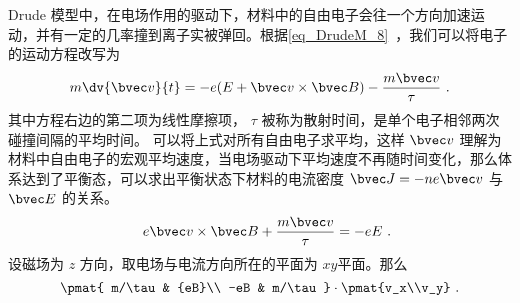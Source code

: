 Drude 模型中，在电场作用的驱动下，材料中的自由电子会往一个方向加速运动，并有一定的几率撞到离子实被弹回。根据\autoref{eq_DrudeM_8}~，我们可以将电子的运动方程改写为
\begin{equation}
m\dv{\bvec v}{t} =  -e(E+\bvec v\times \bvec B)-\frac{m\bvec v}{\tau} ~.
\end{equation}
其中方程右边的第二项为线性摩擦项， $\tau$ 被称为散射时间，是单个电子相邻两次碰撞间隔的平均时间。
可以将上式对所有自由电子求平均，这样 $\bvec v$ 理解为材料中自由电子的宏观平均速度，当电场驱动下平均速度不再随时间变化，那么体系达到了平衡态，可以求出平衡状态下材料的电流密度 $\bvec J=-ne\bvec v$ 与 $\bvec E$ 的关系。
\begin{equation}
\quad e\bvec v\times \bvec B + \frac{m\bvec v}{\tau} = -eE~.
\end{equation}
设磁场为 $z$ 方向，取电场与电流方向所在的平面为 $xy$平面。那么
\begin{equation}
\pmat{
m/\tau  & {eB}\\
-eB & m/\tau
} 
\cdot 
\pmat{v_x\\v_y}
~.
\end{equation}


